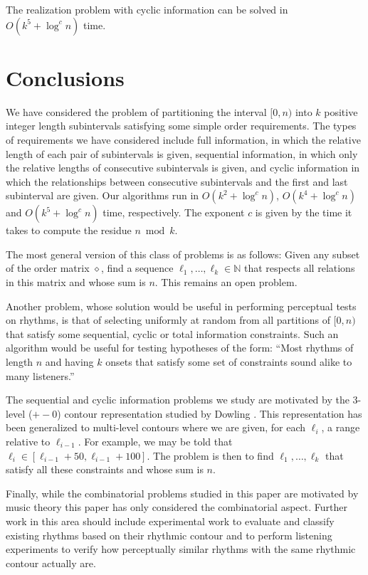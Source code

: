 \documentclass{elsart}
\newcommand{\N}{\mathbb{N}}
\newcommand{\op}{\diamond}
\begin{document}
\begin{thm}
The realization problem with cyclic information can be solved in
$O(k^5+\log^c n)$ time.
\end{thm}


\section{Conclusions}

We have considered the problem of partitioning the interval $[0,n)$
into $k$ positive integer length subintervals satisfying some simple
order requirements.  The types of requirements we have considered
include full information, in which the relative length of each pair of
subintervals is given, sequential information, in which only the
relative lengths of consecutive subintervals is given, and cyclic
information in which the relationships between consecutive
subintervals and the first and last subinterval are given.  Our
algorithms run in $O(k^2+\log^c n)$, $O(k^4+\log^c n)$ and
$O(k^5+\log^cn)$ time, respectively. The exponent $c$ is given by the
time it takes to compute the residue $n\bmod k$.

The most general version of this class of problems is as follows:
Given any subset of the order matrix $\op$, find a sequence
$\ell_1,\ldots,\ell_k\in\N$ that respects all relations in this matrix and
whose sum is $n$. This remains an open problem.

Another problem, whose solution would be useful in performing
perceptual tests on rhythms, is that of selecting uniformly at random
from all partitions of $[0,n)$ that satisfy some sequential, cyclic or
total information constraints.  Such an algorithm would be useful for
testing hypotheses of the form:  ``Most rhythms of length $n$ and
having $k$ onsets that satisfy some set of constraints sound alike to
many listeners.'' 

The sequential and cyclic information problems we study are motivated
by the 3-level ($+-0$) contour representation studied by Dowling
\cite{d78}.  This representation has been generalized to multi-level
contours \cite{l96,kcgv00} where we are given, for each $\ell_i$, a range
relative to $\ell_{i-1}$.  For example, we may be told that $\ell_{i}\in
[\ell_{i-1} + 50, \ell_{i-1}+100]$.  The problem is then to find
$\ell_1,\ldots,\ell_k$ that satisfy all these constraints and whose sum is
$n$.

Finally, while the combinatorial problems studied in this paper are
motivated by music theory this paper has only considered the
combinatorial aspect.  Further work in this area should include
experimental work to evaluate and classify existing rhythms based on
their rhythmic contour and to perform listening experiments to verify how
perceptually similar rhythms with the same rhythmic contour actually
are.
\end{document}
